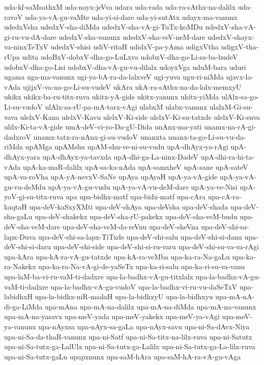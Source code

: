 {uda-kf-saMsathxM
uda-nayx-jeVva
udara
uda-rada
uda-ra-sAthx-na-dalilx
uda-ravoV
uda-ya-vA-gu-vaMte
uda-yi-si-dare
uda-yi-sutAtx
udayx-ma-vanunx
udedxVsha
udedxV-sha-diMda
udedxV-sha-vA-gi-TuTx-koMDu
udedxV-sha-vA-gi-ru-vu-dA-dare
udedxV-sha-vanunx
udedxV-sha-veV-neM-dare
udedxV-shayx-va-ninxTeTxV
udedxV-shisi
udiV-ritaH
udidxV-pa-yAma
udigxVtha
udigxV-tha-rUpa
udita
udoBxV-dobxV-dha-go-LuLxva
udobxV-dha-go-Li-sa-ba-hudeV
udobxV-dha-go-Lisi
udobxV-dha-vA-gu-vu-dilalx
udoyxVga
uduM-bara
uduri
ugama
uga-ma-vanunx
ugi-ya-bA-ra-da-lalxveV
ugi-yuva
ugu-ri-niMda
ujavx-la-vAda
ujijxV-va-na-go-Li-su-vudeV
ukAra
ukA-ra-sAthx-na-da-lolx-memxyU
ukikx
ukikx-ba-ru-titx-ruva
ukitx-yA-gide
ukitx-yanunx
ukitx-yiMda
ulAlx-sa-go-Li-su-vudoV
ulAlx-sa-rU-pa-mA-tarx-vAgi
ulabxM
ulabx-vanunx
ulalxM-Gi-su-vava
ulelxV-Kana
ulelxV-Kavu
ulelxV-Ki-side
ulelxV-Ki-su-tatxde
ulelxV-Ki-suva
ulilx-Ki-ta-vA-gide
umA-deV-vi-yo-Da-gU-Dida
unAnx-ma-yati
unamx-na-rA-gi-dadxroV
unamx-tatx-ra-nAnx-gi-su-vudoV
unanxta
unanx-ta-go-Li-su-vu-da-riMda
upAMga
upAMshu
upAM-shu-ve-ni-su-vudu
upA-dhAyx-ya-rAgi
upA-dhAyx-yara
upA-dhAyx-ya-tavxda
upA-dhi-ga-La-ninx-DadeV
upA-dhi-ra-hi-ta-vAda
upA-ka-maR-dalilx
upA-sa-ka-nAda
upA-samxheV
upA-sane
upA-sateV
upA-va-roVha
upA-yA-nevxV-SaNe
upAya
upAyaH
upA-ya-vA-gide
upA-ya-vA-gu-vu-deMdu
upA-ya-vA-gu-vudu
upA-ya-vA-vu-deM-dare
upA-ya-ve-Nisi
upA-yoV-gi-su-titx-ruva
upa
upa-bidhx-matf
upa-bidx-matf
upa-cAra
upa-cA-ra-kaqtaH
upa-deV-kaSxyXMti
upa-deV-shAya
upa-deVsha
upa-deV-shada
upa-deV-sha-gaLu
upa-deV-shakekx
upa-deV-sha-rU-pakekx
upa-deV-sha-veM-budu
upa-deV-sha-veM-dare
upa-deV-sha-veM-da-reVnu
upa-deV-sheVna
upa-deV-shi-sa-lapx-Duva
upa-deV-shi-sa-lapx-TiTxde
upa-deV-shi-salu
upa-deV-shi-si-danu
upa-deV-shi-si-daru
upa-deV-shi-side
upa-deV-shi-si-ru-varu
upa-deV-shi-su-va-va-rAgi
upa-kAra
upa-kA-ra-vA-gu-tatxde
upa-kA-ra-veMba
upa-ka-ra-Na-gaLu
upa-ka-ra-Nakekx
upa-ka-ra-Na-vA-gi-de-yaSeTx
upa-ka-ri-salu
upa-ka-ri-su-va-vanu
upa-laM-ba-vi-ru-vaM-ti-dadxre
upa-la-badhx-vA-gu-titxlalx
upa-la-badhx-vA-gu-vaM-ti-dadxre
upa-la-badhx-vA-gu-vudoV
upa-la-badhx-vi-ru-vu-daSeTxV
upa-labidhxH
upa-la-bidhx-niR-madaH
upa-la-bidhxyU
upa-la-bidhxyu
upa-mA-nA-di-ga-LiMda
upa-mAna
upa-mA-na-dalilx
upa-mA-na-diMda
upa-mA-na-vanunx
upa-mA-na-yasavx
upa-meV-yada
upa-meV-yakekx
upa-meV-ya-vAgi
upa-meV-ya-vanunx
upa-nAyxsa
upa-nAyx-sa-gaLa
upa-nAyx-savu
upa-ni-Sa-dAvx-Niya
upa-ni-Sa-da-thaR-vanunx
upa-ni-Satf
upa-ni-Sa-titx-na-lilx-ruva
upa-ni-Satutx
upa-ni-Sa-tutx-ga-LalUlx
upa-ni-Sa-tutx-ga-Lalilx
upa-ni-Sa-tutx-ga-La-lilx-ruva
upa-ni-Sa-tutx-gaLu
upapxnunx
upa-saM-hAra
upa-saM-hA-ra-vA-gu-vAga
}
